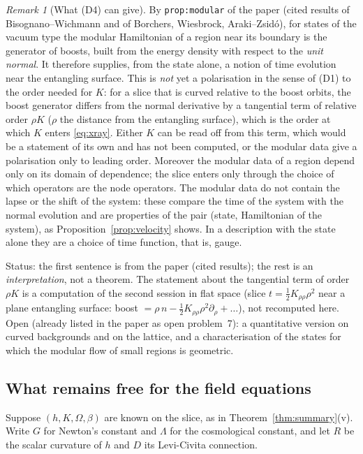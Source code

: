 \documentclass[a4paper,11pt]{article}
\theoremstyle{definition}
\theoremstyle{remark}
\newtheorem{remark}[theorem]{Remark}
\newcommand{\status}[1]{\par\noindent\textsf{\small Status: #1}\par}
\begin{document}
\begin{remark}[What \textup{(D4)} can give]
By \texttt{prop:modular} of the paper (cited results of Bisognano--Wichmann and of Borchers, Wiesbrock, Araki--Zsid\'o), for states of the vacuum type the modular Hamiltonian of a region near its boundary is the generator of boosts, built from the energy density with respect to the \emph{unit normal}. It therefore supplies, from the state alone, a notion of time evolution near the entangling surface. This is \emph{not} yet a polarisation in the sense of \textup{(D1)} to the order needed for $K$: for a slice that is curved relative to the boost orbits, the boost generator differs from the normal derivative by a tangential term of relative order $\rho K$ ($\rho$ the distance from the entangling surface), which is the order at which $K$ enters \eqref{eq:xray}. Either $K$ can be read off from this term, which would be a statement of its own and has not been computed, or the modular data give a polarisation only to leading order. Moreover the modular data of a region depend only on its domain of dependence; the slice enters only through the choice of which operators are the node operators. The modular data do not contain the lapse or the shift of the system: these compare the time of the system with the normal evolution and are properties of the pair (state, Hamiltonian of the system), as Proposition~\ref{prop:velocity} shows. In a description with the state alone they are a choice of time function, that is, gauge.
\end{remark}
\status{the first sentence is from the paper (cited results); the rest is an \emph{interpretation}, not a theorem. The statement about the tangential term of order $\rho K$ is a computation of the second session in flat space (slice $t=\tfrac12K_{\rho\rho}\rho^2$ near a plane entangling surface: boost $=\rho\,n-\tfrac12K_{\rho\rho}\rho^2\partial_\rho+\dots$), not recomputed here. Open (already listed in the paper as open problem~7): a quantitative version on curved backgrounds and on the lattice, and a characterisation of the states for which the modular flow of small regions is geometric.}

\subsection{What remains free for the field equations}

Suppose $(h,K,\Omega,\beta)$ are known on the slice, as in Theorem~\ref{thm:summary}(v). Write $G$ for Newton's constant and $\Lambda$ for the cosmological constant, and let $R$ be the scalar curvature of $h$ and $D$ its Levi-Civita connection.
\end{document}
